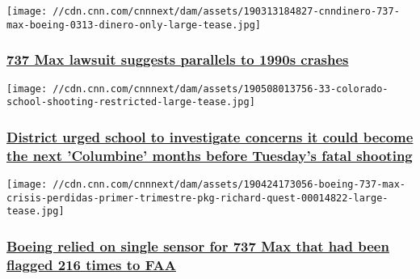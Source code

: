 \href{/2019/05/21/politics/boeing-737-max-lawsuit-1990s-crashes/index.html}{}

\texttt{[image: //cdn.cnn.com/cnnnext/dam/assets/190313184827-cnndinero-737-max-boeing-0313-dinero-only-large-tease.jpg]}

\hypertarget{737-max-lawsuit-suggests-parallels-to-1990s-crashes}{%
\subsubsection{\texorpdfstring{\href{/2019/05/21/politics/boeing-737-max-lawsuit-1990s-crashes/index.html}{737
Max lawsuit suggests parallels to 1990s
crashes}}{737 Max lawsuit suggests parallels to 1990s crashes}}\label{737-max-lawsuit-suggests-parallels-to-1990s-crashes}}

\href{/2019/05/09/us/colorado-shooting-district-investigation/index.html}{}

\texttt{[image: //cdn.cnn.com/cnnnext/dam/assets/190508013756-33-colorado-school-shooting-restricted-large-tease.jpg]}

\hypertarget{district-urged-school-to-investigate-concerns-it-could-become-the-next-columbine-months-before-tuesdays-fatal-shooting}{%
\subsubsection{\texorpdfstring{\href{/2019/05/09/us/colorado-shooting-district-investigation/index.html}{District
urged school to investigate concerns it could become the next
'Columbine' months before Tuesday's fatal
shooting}}{District urged school to investigate concerns it could become the next 'Columbine' months before Tuesday's fatal shooting}}\label{district-urged-school-to-investigate-concerns-it-could-become-the-next-columbine-months-before-tuesdays-fatal-shooting}}

\href{/2019/04/30/politics/boeing-sensor-737-max-faa/index.html}{}

\texttt{[image: //cdn.cnn.com/cnnnext/dam/assets/190424173056-boeing-737-max-crisis-perdidas-primer-trimestre-pkg-richard-quest-00014822-large-tease.jpg]}

\hypertarget{boeing-relied-on-single-sensor-for-737-max-that-had-been-flagged-216-times-to-faa-}{%
\subsubsection{\texorpdfstring{\href{/2019/04/30/politics/boeing-sensor-737-max-faa/index.html}{Boeing
relied on single sensor for 737 Max that had been flagged 216 times to
FAA
}}{Boeing relied on single sensor for 737 Max that had been flagged 216 times to FAA }}\label{boeing-relied-on-single-sensor-for-737-max-that-had-been-flagged-216-times-to-faa-}}

